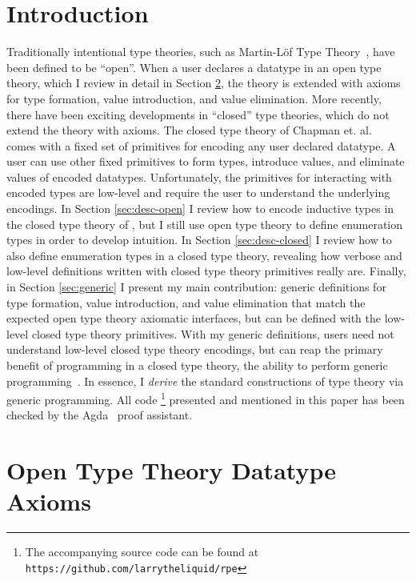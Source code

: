 \documentclass[runningheads,a4paper]{llncs}
\newcommand{\refsec}[1]{Section \ref{sec:#1}}
\begin{document}
\section{Introduction}
\label{sec:intro}

Traditionally intentional type theories, such as
Martin-L{\"o}f Type Theory~\cite{martin1975intuitionistic}, have been defined to be ``open''.
When a user declares a datatype in an open type theory,
which I review in detail in \refsec{axiom}, the theory is extended
with axioms for type formation, value introduction, and value
elimination. More recently, there have been exciting developments in
``closed'' type theories, which do not extend the theory with axioms.
The closed type theory of Chapman et. al.
~\cite{Chapman:2010:GAL:1932681.1863547,dagand:phd} comes with a fixed set
of primitives for encoding any user declared datatype. A user can use
other fixed primitives to form types, introduce values, and eliminate
values of encoded datatypes. Unfortunately, the primitives for
interacting with encoded types are low-level and require the user to
understand the underlying encodings. In \refsec{desc-open} I review
how to encode inductive types in the closed type theory of
\cite{Chapman:2010:GAL:1932681.1863547,dagand:phd}, but I still use
open type theory to define enumeration types in order to develop intuition.
In \refsec{desc-closed} I review how to also define enumeration types
in a closed type theory, revealing how verbose and low-level
definitions written with closed type theory primitives really are.
Finally, in \refsec{generic} I present my main contribution:
generic definitions for type formation, value introduction, and
value elimination that match the expected open type theory axiomatic
interfaces, but can be defined with the low-level closed type theory
primitives. With my generic definitions, users need not understand
low-level closed type theory encodings, but can reap the primary
benefit of programming in a closed type theory, the ability to perform
generic programming~\cite{dagand:phd,mcbride2010ornamental,Dagand:2012:TFA:2398856.2364544}. In
essence, I {\it derive} the standard constructions of type theory via
generic programming.
All code
\footnote{\raggedright{The accompanying source code can be found at
{\tt https://github.com/larrytheliquid/rpe}}}
presented and mentioned in this paper has been checked by
the {\sc Agda}~\cite{norell2007towards} proof assistant.

\section{Open Type Theory Datatype Axioms}
\label{sec:axiom}
\end{document}
